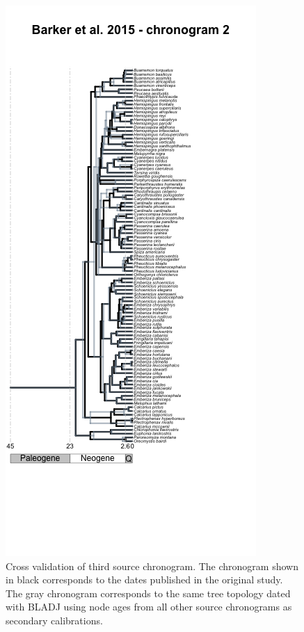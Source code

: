 \documentclass[
  english,
  man]{apa6}
\begin{document}
\begin{figure}[!h]
\includegraphics{../figures/figure-cross-validation/cross_validation_3.png}
\caption{Cross validation of third source chronogram. The chronogram shown in black corresponds to the dates published in the original study. The gray chronogram corresponds to the same tree topology dated with BLADJ using node ages from all other source chronograms as secondary calibrations.}
\label{fig:cv3}
\end{figure}
\end{document}
